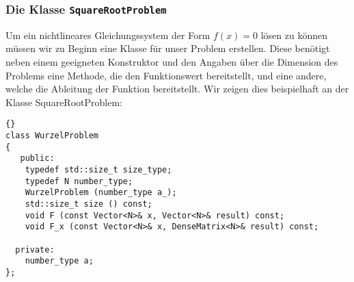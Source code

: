 \documentclass[a4paper,11pt]{article}
\theoremstyle{definition}
\begin{document}
\subsubsection{Die Klasse \lstinline{SquareRootProblem}}
Um ein nichtlineares Gleichungssystem der Form $f(x)=0$ lösen zu können müssen wir zu Beginn eine Klasse für unser Problem erstellen. Diese benötigt neben einem geeigneten Konstruktor und den Angaben über die Dimension des Problems eine Methode, die den Funktionswert bereitstellt, und eine andere, welche die Ableitung der Funktion bereitstellt.
Wir zeigen dies beispielhaft an der Klasse SquareRootProblem:
  {\footnotesize{\begin{lstlisting}{}
class WurzelProblem
{
   public:
    typedef std::size_t size_type;
    typedef N number_type;
    WurzelProblem (number_type a_);    
    std::size_t size () const;
    void F (const Vector<N>& x, Vector<N>& result) const;
    void F_x (const Vector<N>& x, DenseMatrix<N>& result) const;
      
  private:
    number_type a;
};
      \end{lstlisting}}}
\end{document}
